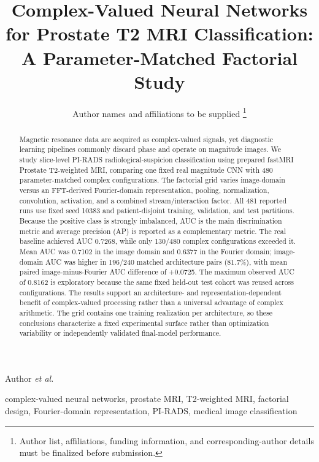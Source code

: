 \documentclass[journal]{IEEEtran}
\begin{document}
\title{Complex-Valued Neural Networks for Prostate T2 MRI Classification: A Parameter-Matched Factorial Study}

\author{Author names and affiliations to be supplied%
\thanks{Author list, affiliations, funding information, and corresponding-author details must be finalized before submission.}}

%
{Author \MakeLowercase{\emph{et al.}}}

\maketitle

\begin{abstract}
Magnetic resonance data are acquired as complex-valued signals, yet diagnostic learning pipelines commonly discard phase and operate on magnitude images. We study slice-level PI-RADS radiological-suspicion classification using prepared fastMRI Prostate T2-weighted MRI, comparing one fixed real magnitude CNN with 480 parameter-matched complex configurations. The factorial grid varies image-domain versus an FFT-derived Fourier-domain representation, pooling, normalization, convolution, activation, and a combined stream/interaction factor. All 481 reported runs use fixed seed 10383 and patient-disjoint training, validation, and test partitions. Because the positive class is strongly imbalanced, AUC is the main discrimination metric and average precision (AP) is reported as a complementary metric. The real baseline achieved AUC 0.7268, while only 130/480 complex configurations exceeded it. Mean AUC was 0.7102 in the image domain and 0.6377 in the Fourier domain; image-domain AUC was higher in 196/240 matched architecture pairs (81.7\%), with mean paired image-minus-Fourier AUC difference of +0.0725. The maximum observed AUC of 0.8162 is exploratory because the same fixed held-out test cohort was reused across configurations. The results support an architecture- and representation-dependent benefit of complex-valued processing rather than a universal advantage of complex arithmetic. The grid contains one training realization per architecture, so these conclusions characterize a fixed experimental surface rather than optimization variability or independently validated final-model performance.
\end{abstract}

\begin{IEEEkeywords}
complex-valued neural networks, prostate MRI, T2-weighted MRI, factorial design, Fourier-domain representation, PI-RADS, medical image classification
\end{IEEEkeywords}
\end{document}
